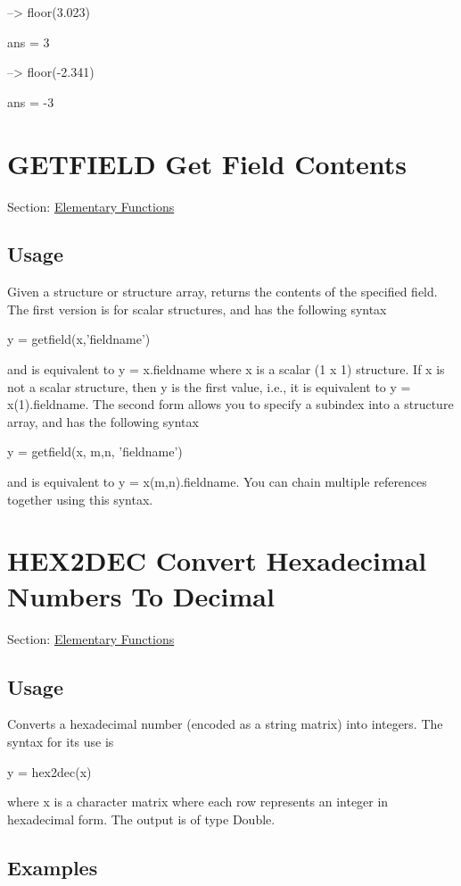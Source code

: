 \begin{DoxyVerbInclude}
--> floor(3.023)

ans = 
 3 

--> floor(-2.341)

ans = 
 -3 
\end{DoxyVerbInclude}
 \hypertarget{elementary_getfield}{}\section{G\-E\-T\-F\-I\-E\-L\-D Get Field Contents}\label{elementary_getfield}
Section\-: \hyperlink{sec_elementary}{Elementary Functions} \hypertarget{vtkwidgets_vtkxyplotwidget_Usage}{}\subsection{Usage}\label{vtkwidgets_vtkxyplotwidget_Usage}
Given a structure or structure array, returns the contents of the specified field. The first version is for scalar structures, and has the following syntax \begin{DoxyVerb}   y = getfield(x,'fieldname')
\end{DoxyVerb}
 and is equivalent to {\ttfamily y = x.\-fieldname} where {\ttfamily x} is a scalar (1 x 1) structure. If {\ttfamily x} is not a scalar structure, then {\ttfamily y} is the first value, i.\-e., it is equivalent to {\ttfamily y = x(1).fieldname}. The second form allows you to specify a subindex into a structure array, and has the following syntax \begin{DoxyVerb}    y = getfield(x, {m,n}, 'fieldname')
\end{DoxyVerb}
 and is equivalent to {\ttfamily y = x(m,n).fieldname}. You can chain multiple references together using this syntax. \hypertarget{elementary_hex2dec}{}\section{H\-E\-X2\-D\-E\-C Convert Hexadecimal Numbers To Decimal}\label{elementary_hex2dec}
Section\-: \hyperlink{sec_elementary}{Elementary Functions} \hypertarget{vtkwidgets_vtkxyplotwidget_Usage}{}\subsection{Usage}\label{vtkwidgets_vtkxyplotwidget_Usage}
Converts a hexadecimal number (encoded as a string matrix) into integers. The syntax for its use is \begin{DoxyVerb}   y = hex2dec(x)
\end{DoxyVerb}
 where {\ttfamily x} is a character matrix where each row represents an integer in hexadecimal form. The output is of type {\ttfamily Double}. \hypertarget{variables_matrix_Examples}{}\subsection{Examples}\label{variables_matrix_Examples}

